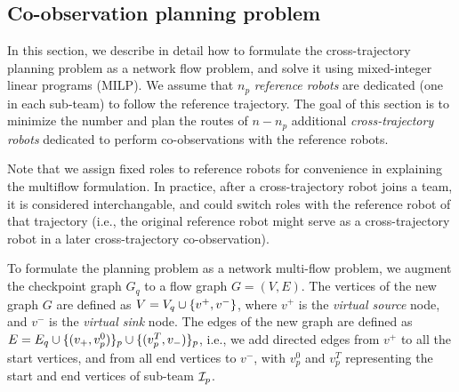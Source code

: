 \documentclass[journal]{IEEEtran}  %
\begin{document}

\subsection{Co-observation planning problem}
In this section, we describe in detail how to formulate the cross-trajectory planning problem as a network flow problem, and solve it using mixed-integer linear programs (MILP). We assume that $n_p$ \emph{reference robots} are dedicated (one in each sub-team) to follow the reference trajectory.  The goal of this section is to minimize the number and plan the routes of $n-n_p$  additional \emph{cross-trajectory robots} dedicated to perform co-observations with the reference robots. 

\begin{remark}
Note that we assign fixed roles to reference robots for convenience in explaining the multiflow formulation. In practice, after a cross-trajectory robot joins a team, it is considered interchangable, and could switch roles with the reference robot of that trajectory (i.e., the original reference robot might serve as a cross-trajectory robot in a later cross-trajectory co-observation).
\end{remark}

To formulate the planning problem as a network multi-flow problem, we augment the checkpoint graph $G_{q}$ to a flow graph $G=(V, E)$. The vertices of the new graph $G$ are defined as $V= V_{q} \cup \{v^{+},v^{-}\}$, where $v^{+}$ is the \emph{virtual source} node, and $v^{-}$ is the \emph{virtual sink} node. The edges of the new graph are defined as $E = E_{q} \cup \{(v_{+},v^{0}_{p})\}_{p} \cup \{( v^{T}_{p},v_{-})\}_{p}$, i.e., we add directed edges from $v^{+}$ to all the start vertices, and from all end vertices to $v^{-}$, with $v^0_p$ and $v^T_p$ representing the start and end vertices of sub-team $\mathcal{I}_p$.
\end{document}
